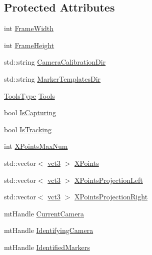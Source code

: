 \subsection*{Protected Attributes}
\begin{DoxyCompactItemize}
\item 
int \hyperlink{classmts_micron_tracker_a5e43bc9b8bfb0ecfa61c31382e371bd0}{Frame\-Width}
\item 
int \hyperlink{classmts_micron_tracker_a5823ad8e94db01e18081a2649b085ffe}{Frame\-Height}
\item 
std\-::string \hyperlink{classmts_micron_tracker_a1107867a28954dd0b2db6c2d42843438}{Camera\-Calibration\-Dir}
\item 
std\-::string \hyperlink{classmts_micron_tracker_ab2b76f57d976389591206c1f1bc3bb35}{Marker\-Templates\-Dir}
\item 
\hyperlink{classmts_micron_tracker_a240bfec6cae665e2f2f53ec31bbcff12}{Tools\-Type} \hyperlink{classmts_micron_tracker_a3da35d113b3b770a7ebc1ddd354cc44b}{Tools}
\item 
bool \hyperlink{classmts_micron_tracker_a333d3b5289a981be85aaa070b2a8d672}{Is\-Capturing}
\item 
bool \hyperlink{classmts_micron_tracker_ab683a357bdbc34205e4156240be69436}{Is\-Tracking}
\item 
int \hyperlink{classmts_micron_tracker_aec7b0fc645223abd56ea77aba3687df8}{X\-Points\-Max\-Num}
\item 
std\-::vector$<$ \hyperlink{vct_fixed_size_vector_types_8h_a3af82acdbf4eeb73c551909240b106ea}{vct3} $>$ \hyperlink{classmts_micron_tracker_a92050577b1193e76a362e8c81708932c}{X\-Points}
\item 
std\-::vector$<$ \hyperlink{vct_fixed_size_vector_types_8h_a3af82acdbf4eeb73c551909240b106ea}{vct3} $>$ \hyperlink{classmts_micron_tracker_a2e35c998885291f730e1a55f990b464d}{X\-Points\-Projection\-Left}
\item 
std\-::vector$<$ \hyperlink{vct_fixed_size_vector_types_8h_a3af82acdbf4eeb73c551909240b106ea}{vct3} $>$ \hyperlink{classmts_micron_tracker_a7e0cac34b4700293cd83d15e57ad057f}{X\-Points\-Projection\-Right}
\item 
mt\-Handle \hyperlink{classmts_micron_tracker_a51945d6df1036a1bd179ed1163cd3eff}{Current\-Camera}
\item 
mt\-Handle \hyperlink{classmts_micron_tracker_a8b664e2a78bd433ddd14c306b093575d}{Identifying\-Camera}
\item 
mt\-Handle \hyperlink{classmts_micron_tracker_a80790bbda44e575b40c4d1041a69e5fa}{Identified\-Markers}

\end{DoxyCompactItemize}
